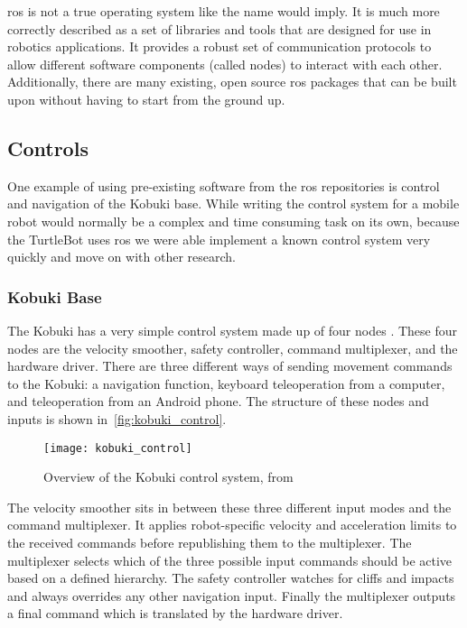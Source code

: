 \documentclass[thesis.tex]{subfile}
\begin{document}
\gls{ros} is not a true operating system like the name would imply. It is much more correctly described as a set of libraries and tools that are designed for use in robotics applications. It provides a robust set of communication protocols to allow different software components (called nodes) to interact with each other. Additionally, there are many existing, open source \gls{ros} packages that can be built upon without having to start from the ground up.

\subsection{Controls} \label{sec:controls}
One example of using pre-existing software from the \gls{ros} repositories is control and navigation of the Kobuki base. While writing the control system for a mobile robot would normally be a complex and time consuming task on its own, because the TurtleBot uses \gls{ros} we were able implement a known control system very quickly and move on with other research.

\subsubsection{Kobuki Base}
The Kobuki has a very simple control system made up of four nodes \cite{KobukiControl}. These four nodes are the velocity smoother, safety controller, command multiplexer, and the hardware driver. There are three different ways of sending movement commands to the Kobuki: a navigation function, keyboard teleoperation from a computer, and teleoperation from an Android phone. The structure of these nodes and inputs is shown in~\autoref{fig:kobuki_control}.

\begin{figure}
\texttt{[image: kobuki\_control]}
\caption[Overview of the Kobuki control system]{Overview of the Kobuki control system, from~\cite{KobukiControl}}
\label{fig:kobuki_control}
\end{figure}

The velocity smoother sits in between these  three different input modes and the command multiplexer. It applies robot-specific velocity and acceleration limits to the received commands before republishing them to the multiplexer. The multiplexer selects which of the three possible input commands should be active based on a defined hierarchy. The safety controller watches for cliffs and impacts and always overrides any other navigation input. Finally the multiplexer outputs a final command which is translated by the hardware driver.
 
\end{document}
